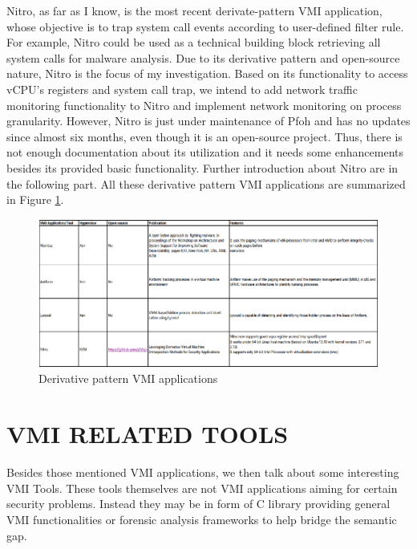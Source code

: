 Nitro, as far as I know, is the most recent derivate-pattern VMI application, whose objective is to trap system call events according to 
user-defined filter rule. For example, Nitro could be used as a technical building block retrieving all system calls for malware analysis. 
Due to its derivative pattern and open-source nature, Nitro is the focus of my investigation. Based on its functionality to access vCPU’s 
registers and system call trap, we intend to add network traffic monitoring functionality to Nitro and implement network monitoring on process 
granularity. However, Nitro is just under maintenance of Pfoh and has no updates since almost six months, even though it is an open-source 
project. Thus, there is not enough documentation about its utilization and it needs some enhancements besides its provided basic functionality.
Further introduction about Nitro are in the following part. All these derivative pattern VMI applications are summarized in Figure 
\ref{fig:Derivative pattern VMI applications}.

\begin{figure}[htbp]
	\centering
		\includegraphics{Figures/Figure2.pdf}
	\caption[Derivative pattern VMI applications]{Derivative pattern VMI applications}
	\label{fig:Derivative pattern VMI applications}
\end{figure}



\section{VMI RELATED TOOLS}

Besides those mentioned VMI applications, we then talk about some interesting VMI Tools. These tools themselves are not VMI applications aiming
for certain security problems. Instead they may be in form of C library providing general VMI functionalities or forensic analysis frameworks 
to help bridge the semantic gap.

